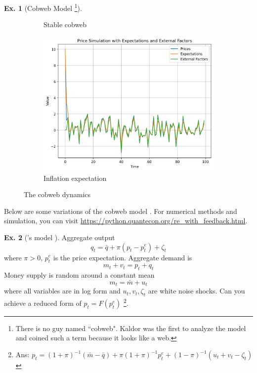 \documentclass[11pt,a4paper]{book}
\theoremstyle{definition}\newtheorem{definition}{Definition}
\theoremstyle{definition}\newtheorem{fact}{Fact}
\theoremstyle{definition}\newtheorem{remark}{Remark}
\theoremstyle{definition}\newtheorem{ex}{Ex.}
\theoremstyle{definition}\newtheorem{project}{Project}
\theoremstyle{definition}\newtheorem{problem}{Problem}
\theoremstyle{definition}\newtheorem{example}{Example}
\numberwithin{theorem}{section}
\numberwithin{corollary}{chapter}
\numberwithin{assumption}{chapter}
\numberwithin{definition}{chapter}
\numberwithin{prop}{chapter}
\numberwithin{notation}{chapter}
\numberwithin{problem}{chapter}
\numberwithin{example}{chapter}
\numberwithin{fact}{chapter}
\numberwithin{ex}{chapter}
\begin{document}
\begin{ex}[Cobweb Model \citep{kaldor1934classificatory} \footnote{There is no guy named ``cobweb". Kaldor was the first to analyze the model and coined such a term because it looks like a web.}]
\begin{figure}[ht]
\begin{subfigure}[b]{0.4\linewidth}
				\caption{Stable cobweb \citep{sydsaeter2008further}}
			\end{subfigure}
			\begin{subfigure}[b]{0.4\linewidth}
				\includegraphics[width=\linewidth]{figs/price_fluc.png}
				\caption{Inflation expectation}
			\end{subfigure}
			\caption{The cobweb dynamics}
		\end{figure}
	\end{ex}	
	
	Below are some variations of the cobweb model \citep{evans2001learning}. For numerical methods and simulation, you can visit \url{https://python.quantecon.org/re_with_feedback.html}.
	\begin{ex}[\citet{lucas1973some}'s model ]
		Aggregate output
		$$
			q_t = \bar{q} + \pi (p_t - p^e_t) + \zeta_t
		$$
		where $\pi > 0$, $p^e_t$ is the price expectation. Aggregate demand is
		$$
			m_t + v_t = p_t + q_t
		$$
		Money supply is random around a constant mean
		$$
			m_t = \bar{m} + u_t
		$$
		where all variables are in log form and $u_t, v_t, \zeta_t$ are white noise shocks. Can you achieve a reduced form of $p_t = F(p^e_t)$ \footnote{Ans: $p_t = (1+\pi)^{-1} (\bar{m} - \bar{q}) + \pi (1+\pi)^{-1} p^e_t + (1-\pi)^{-1} (u_t + v_t - \zeta_t) $}.
	\end{ex}
	
\end{document}
